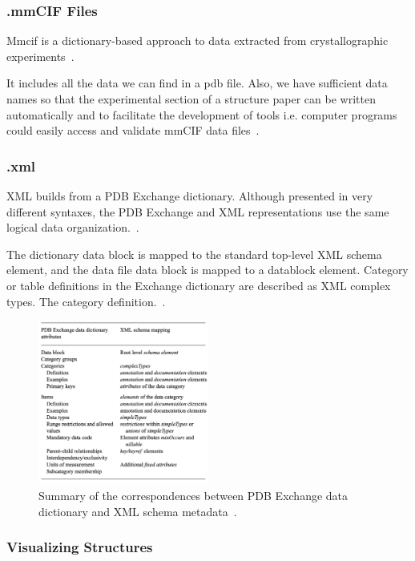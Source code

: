 \documentclass[]{final_report}
\begin{document}
\subsubsection{.mmCIF Files}
Mmcif is a dictionary-based approach to data extracted from crystallographic experiments~\cite{westbrook_pdb_2003}.

It includes all the data we can find in a pdb file. Also, we have sufficient data names so that the experimental section of a structure paper can be written automatically and to facilitate the development of tools i.e. computer programs could easily access and validate mmCIF data files~\cite{westbrook_pdb_2003}.

\subsubsection{.xml}

XML builds from a PDB Exchange dictionary. Although presented in very different syntaxes, the PDB Exchange and XML representations use the same logical data organization.~\cite{westbrook_pdbml_2005}.

The dictionary data block is mapped to the standard top-level XML schema element, and the data file data block is mapped to a datablock element. Category or table definitions in the Exchange dictionary are described as XML complex types. The category definition.~\cite{westbrook_pdbml_2005}.

\begin{figure}[ht]
    \centering
    \includegraphics[width=0.5\textwidth]{xml.png}
    \caption{\label{fig:xml}Summary of the correspondences between PDB Exchange data dictionary and XML schema metadata~\cite{westbrook_pdbml_2005}.}
\end{figure}


\subsubsection{Visualizing Structures}
\end{document}
